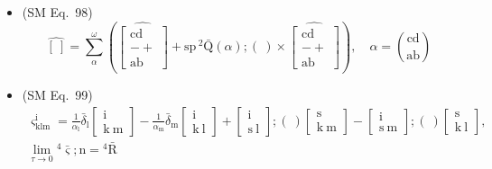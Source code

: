 \documentclass[12pt]{article}
\begin{document}
\begin{itemize}[label={},leftmargin=0pt]
    \item (SM Eq.\ 98) 
    \[
    \widehat{[\ ]} = \sum_\alpha^\omega \left( \widehat{\left[ \begin{smallmatrix} \mathrm{cd} \\ - + \\ \mathrm{ab} \end{smallmatrix} \right]} + \mathrm{sp}\,{}^2\bar{\mathrm{Q}}(\alpha);(\ ) \times \widehat{\left[ \begin{smallmatrix} \mathrm{cd} \\ - + \\ \mathrm{ab} \end{smallmatrix} \right]} \right), \quad \alpha = \binom{\mathrm{cd}}{\mathrm{ab}}
    \]

    \item (SM Eq.\ 99) 
    \[
    \begin{gathered}
    \varsigma^\mathrm{i}_{\mathrm{klm}} = \frac{1}{\alpha_\mathrm{l}}\bar{\delta}_\mathrm{l} \left[ \begin{smallmatrix} \mathrm{i} \\ \mathrm{k}\ \mathrm{m} \end{smallmatrix} \right] - \frac{1}{\alpha_\mathrm{m}}\bar{\delta}_\mathrm{m} \left[ \begin{smallmatrix} \mathrm{i} \\ \mathrm{k}\ \mathrm{l} \end{smallmatrix} \right] + \left[ \begin{smallmatrix} \mathrm{i} \\ \mathrm{s}\ \mathrm{l} \end{smallmatrix} \right];(\ ) \left[ \begin{smallmatrix} \mathrm{s} \\ \mathrm{k}\ \mathrm{m} \end{smallmatrix} \right] - \left[ \begin{smallmatrix} \mathrm{i} \\ \mathrm{s}\ \mathrm{m} \end{smallmatrix} \right];(\ ) \left[ \begin{smallmatrix} \mathrm{s} \\ \mathrm{k}\ \mathrm{l} \end{smallmatrix} \right], \\
    \lim_{\tau \to 0} {}^4\bar{\bm{\varsigma}} ; \mathrm{n} = {}^4\bar{\mathrm{R}}
    \end{gathered}
    \]


\end{itemize}
\end{document}
